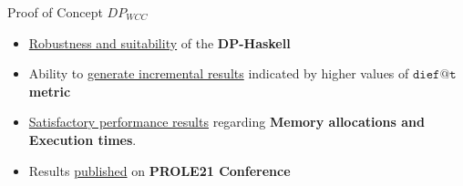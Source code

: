 \begin{frame}[fragile]{Proof of Concept $DP_{WCC}$}
  \begin{itemize}
    \setlength\itemsep{2em}
    \item \underline{\color{red}Robustness and suitability} of the \textbf{DP-Haskell}
    \item Ability to \underline{\color{red}generate incremental results} indicated by higher values of \textbf{$\mathtt{dief@t}$ metric}
    \item \underline{\color{red}Satisfactory performance results} regarding \textbf{Memory allocations and Execution times}. 
    \item Results \underline{\color{red}published} on \textbf{PROLE21 Conference}~\cite{prole:2021:017}
  \end{itemize}
\end{frame}

